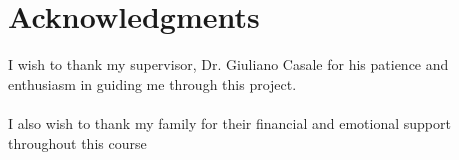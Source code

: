 \section*{Acknowledgments}
I wish to thank my supervisor, Dr. Giuliano Casale for his patience and enthusiasm in guiding me through this project.
\\\\
I also wish to thank my family for their financial and emotional support throughout this course
